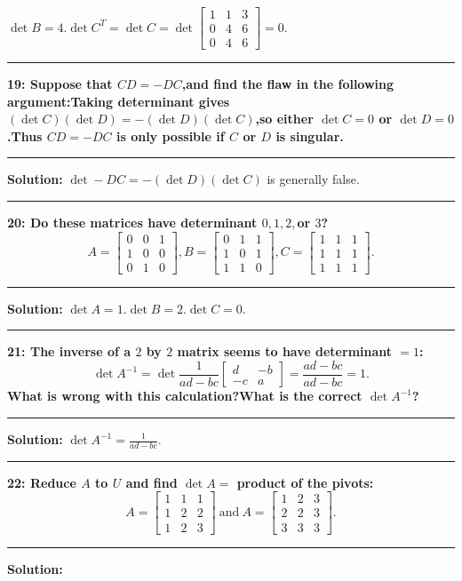 \documentclass[11pt]{article}
\newcommand\question[2]{\vspace{.25in}\hrule\textbf{#1: #2}\vspace{.5em}\hrule\vspace{.10in}}
\newcommand\solution{\vspace{.10in}\textbf{Solution: }}
\begin{document}
$\det B=4$.$\det C^T=\det C=\det
\begin{bmatrix}
  1&1&3\\
  0&4&6\\
  0&4&6
\end{bmatrix}=0.
$
\question{19}{Suppose that $CD=-DC$,and find the flaw in the following
argument:Taking determinant gives $(\det C)(\det D)=-(\det D)(\det
C)$,so either $\det C=0$ or $\det D=0$.Thus $CD=-DC$ is only possible
if $C$ or $D$ is singular.}
\solution $\det -DC= -(\det D)(\det C)$ is generally false.
\question{20}{Do these matrices have determinant $0,1,2,$or $3$?
$$
A=
\begin{bmatrix}
  0&0&1\\
1&0&0\\
0&1&0
\end{bmatrix},B=
\begin{bmatrix}
  0&1&1\\
1&0&1\\
1&1&0
\end{bmatrix},C=
\begin{bmatrix}
  1&1&1\\
1&1&1\\
1&1&1
\end{bmatrix}.
$$
}
\solution $\det A=1$.$\det B=2$.$\det C=0$.
\question{21}{The inverse of a $2$ by $2$ matrix seems to have
  determinant $=1$:
$$
\det A^{-1}=\det \frac{1}{ad-bc}
\begin{bmatrix}
  d&-b\\
-c&a
\end{bmatrix}=\frac{ad-bc}{ad-bc}=1.
$$
What is wrong with this calculation?What is the correct $\det A^{-1}$?
}
\solution $\det A^{-1}=\frac{1}{ad-bc}$.
\question{22}{Reduce $A$ to $U$ and find $\det A=$ product of the
  pivots:
$$
A=
\begin{bmatrix}
  1&1&1\\
1&2&2\\
1&2&3
\end{bmatrix}~\mbox{and}~A=
\begin{bmatrix}
  1&2&3\\
2&2&3\\
3&3&3
\end{bmatrix}.
$$
}
\solution
\end{document}

